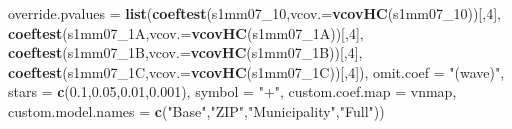 \documentclass[
]{article}
\newenvironment{Shaded}{\begin{snugshade}}{\end{snugshade}}
\newcommand{\DataTypeTok}[1]{\textcolor[rgb]{0.13,0.29,0.53}{#1}}
\newcommand{\DecValTok}[1]{\textcolor[rgb]{0.00,0.00,0.81}{#1}}
\newcommand{\FloatTok}[1]{\textcolor[rgb]{0.00,0.00,0.81}{#1}}
\newcommand{\KeywordTok}[1]{\textcolor[rgb]{0.13,0.29,0.53}{\textbf{#1}}}
\newcommand{\NormalTok}[1]{#1}
\newcommand{\StringTok}[1]{\textcolor[rgb]{0.31,0.60,0.02}{#1}}
\begin{document}
\begin{Shaded}
\begin{Highlighting}[]
          \DataTypeTok{override.pvalues =} \KeywordTok{list}\NormalTok{(}\KeywordTok{coeftest}\NormalTok{(s1mm07_}\DecValTok{10}\NormalTok{,}\DataTypeTok{vcov.=}\KeywordTok{vcovHC}\NormalTok{(s1mm07_}\DecValTok{10}\NormalTok{))[,}\DecValTok{4}\NormalTok{],}
                                  \KeywordTok{coeftest}\NormalTok{(s1mm07_1A,}\DataTypeTok{vcov.=}\KeywordTok{vcovHC}\NormalTok{(s1mm07_1A))[,}\DecValTok{4}\NormalTok{],}
                                  \KeywordTok{coeftest}\NormalTok{(s1mm07_1B,}\DataTypeTok{vcov.=}\KeywordTok{vcovHC}\NormalTok{(s1mm07_1B))[,}\DecValTok{4}\NormalTok{],}
                                  \KeywordTok{coeftest}\NormalTok{(s1mm07_1C,}\DataTypeTok{vcov.=}\KeywordTok{vcovHC}\NormalTok{(s1mm07_1C))[,}\DecValTok{4}\NormalTok{]),}
          \DataTypeTok{omit.coef =} \StringTok{"(wave)"}\NormalTok{, }\DataTypeTok{stars =} \KeywordTok{c}\NormalTok{(}\FloatTok{0.1}\NormalTok{,}\FloatTok{0.05}\NormalTok{,}\FloatTok{0.01}\NormalTok{,}\FloatTok{0.001}\NormalTok{), }\DataTypeTok{symbol =} \StringTok{"+"}\NormalTok{,}
          \DataTypeTok{custom.coef.map =}\NormalTok{ vnmap, }
          \DataTypeTok{custom.model.names =} \KeywordTok{c}\NormalTok{(}\StringTok{"Base"}\NormalTok{,}\StringTok{"ZIP"}\NormalTok{,}\StringTok{"Municipality"}\NormalTok{,}\StringTok{"Full"}\NormalTok{))}
\end{Highlighting}
\end{Shaded}
\end{document}
